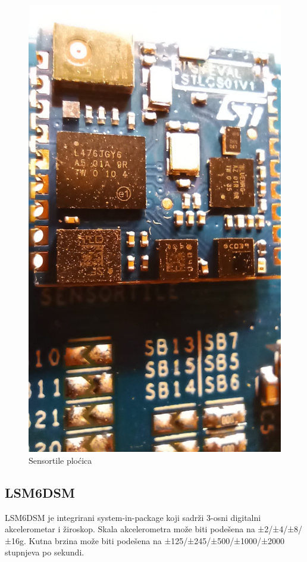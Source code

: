 \documentclass[times, utf8, diplomski]{diplomski}
\begin{document}
\begin{figure}[H]
\includegraphics[scale=0.14]{tile_close.jpeg}
\centering
\caption{Sensortile ploćica}
\end{figure}

\subsection{LSM6DSM}
LSM6DSM \cite{LSM6DSM} je integrirani system-in-package koji sadrži 3-osni digitalni akcelerometar i žiroskop. Skala akcelerometra može biti podešena na ±2/±4/±8/±16g. Kutna brzina može biti podešena na
±125/±245/±500/±1000/±2000 stupnjeva po sekundi.
\end{document}
